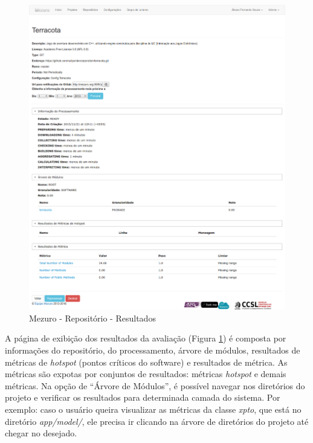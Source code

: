 \begin{figure}[!htb]
	\centering
    \includegraphics[keepaspectratio=true,scale=0.3]
    {figuras/mezuro-repositorio-view-terracota.eps}
  \caption{Mezuro - Repositório - Resultados}
	\label{fig:mezuro-repositorio-view-terracota}
\end{figure}

A página de exibição dos resultados da avaliação (Figura
\ref{fig:mezuro-repositorio-view-terracota}) é composta por informações do
repositório, do processamento, árvore de módulos, resultados de métricas de
\textit{hotspot} (pontos críticos do software) e resultados de métrica.
As métricas são expotas por conjuntos de resultados: métricas \textit{hotspot} e
demais métricas. Na opção de ``Árvore de Módulos'', é possível navegar nos
diretórios do projeto e verificar os resultados para determinada camada do
sistema. Por exemplo: caso o usuário queira visualizar as métricas da classe
\textit{xpto}, que está no diretório \textit{app/model/}, ele precisa ir
clicando na árvore de diretórios do projeto até chegar no desejado.
